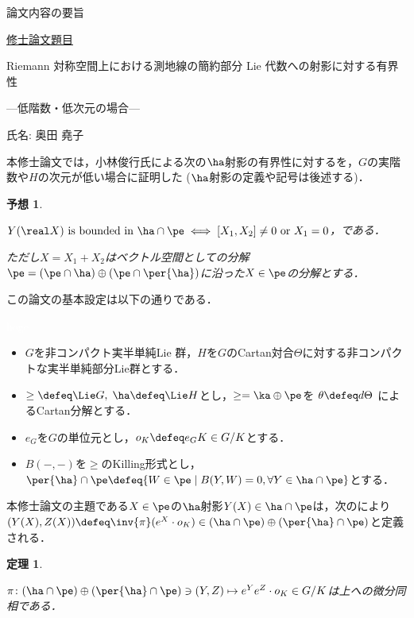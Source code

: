 \documentclass[12pt,dvipdfmx,uplatex]{jsarticle}
\newcounter{countabst}
\newtheorem{yosou-a}[countabst]{予想}
\newtheorem{thm-a}[countabst]{定理}
\begin{document}
% 
\begin{center}
論文内容の要旨
\end{center}

\noindent\underline{修士論文題目}

\begin{center}
Riemann 対称空間上における測地線の簡約部分 Lie 代数への射影に対する有界性

---低階数・低次元の場合---
\end{center}

\noindent 氏名: 奥田 堯子

\vspace{1em}

本修士論文では，小林俊行氏による次の$\ha$射影の有界性に対するを，$G$の実階数や$H$の次元が低い場合に証明した ($\ha$射影の定義や記号は後述する)．

\begin{yosou-a}\label{yosou:1121}
  
  $Y(\real X) \text{ is bounded in } \ha\cap \pe \iff   [X_1, X_2]\neq 0 \text{ or } X_1 = 0$，である．

  ただし$X = X_1 + X_2 $はベクトル空間としての分解$\pe =(\pe\cap \ha)\oplus(\pe\cap\per{\ha}) $に沿った$X\in \pe$の分解とする．
\end{yosou-a}

この論文の基本設定は以下の通りである．
\begin{nttdef*}\textcolor{white}{hoge}
  
  \vspace{-1em}
  \begin{itemize}
  \item $G$を非コンパクト実半単純Lie 群，$H$を$G$のCartan対合$\Theta$に対する非コンパクトな実半単純部分Lie群とする．
  \item $\ge \defeq \Lie G,\; \ha \defeq \Lie H$とし，$\ge = \ka\oplus \pe$を $\theta \defeq d\Theta$ によるCartan分解とする．
  \item  $e_G$を$G$の単位元とし，$o_K \defeq e_GK\in G/K$とする．
  \item $B({-}, {-}) $を$\ge$のKilling形式とし，$\per{\ha}\cap \pe \defeq \{W\in \pe\mid B(Y, W) = 0 ,\forall Y\in \ha\cap \pe\} $とする．
  \end{itemize}
  
\end{nttdef*}

本修士論文の主題である$X\in \pe$の$\ha$射影$Y(X)\in \ha\cap \pe $は，次のにより\\
$(Y(X), Z(X))\defeq \inv{\pi}(e^X\cdot o_K)\in (\ha\cap\pe)\oplus (\per{\ha}\cap \pe)$と定義される．
\begin{thm-a}\cite[Lemma~6.1]{kob89}\label{thm:kob89-lem6.1}

  $\pi\colon  (\ha\cap\pe)\oplus (\per{\ha}\cap \pe) \ni (Y, Z)\mapsto e^{Y}e^{Z}\cdot o_K \in G/K $は上への微分同相である．
\end{thm-a}
\end{document}
